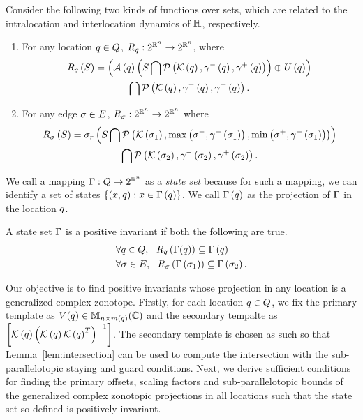 Consider the following two kinds of functions over sets, which are related to the intralocation and interlocation dynamics of $\mathbb{H}$, respectively.
\begin{enumerate}
\item For any location $q\in Q$, $R_{q}:2^{\mathbb{R}^n}\rightarrow 2^{\mathbb{R}^n}$, where 
\begin{multline*}
R_{q}\left(S\right) = \left(\mathcal{A}\left(q\right)\left(S\bigcap\mathcal{P}\left(\mathcal{K}\left(q\right),\gamma^-\left(q\right),\gamma^+\left(q\right)\right)\right)\oplus U\left(q\right)\right)\\  \bigcap \mathcal{P}\left(\mathcal{K}\left(q\right),\gamma^-\left(q\right),\gamma^+\left(q\right)\right).
\end{multline*}
\item For any edge $\sigma\in E$, $R_{\sigma}:2^{\mathbb{R}^n}\rightarrow 2^{\mathbb{R}^n}$ where
\begin{multline*}
R_{\sigma}\left(S\right) =  \sigma_r\left(S\bigcap \mathcal{P}\left(\mathcal{K}\left(\sigma_{1}\right),\max\left(\sigma^-,\gamma^-\left(\sigma_{1}\right)\right),\min\left(\sigma^+,\gamma^+\left(\sigma_{1}\right) \right)\right)\right) \\ \bigcap\mathcal{P}\left(\mathcal{K}\left(\sigma_{2}\right),\gamma^-\left(\sigma_{2}\right),\gamma^+\left(\sigma_{2}\right)\right).
\end{multline*}
\end{enumerate}

We call a mapping $\Gamma:Q\rightarrow 2^{\mathbb{R}^n}$ as
 a \emph{state set} because for such a mapping, we can identify a set
 of states $\left\{\left(x,q\right):x\in\Gamma\left(q\right)\right\}$.  We
 call $\Gamma\left(q\right)$ as
 the projection of $\Gamma$ in the location $q$.

\begin{definition}
A state set $\Gamma$ is a positive invariant if
both the following are true.
\begin{align}
& \forall q\in Q,~~R_{q}\left(\Gamma(q)\right) \subseteq \Gamma\left(q\right)\\
& \forall\sigma\in E,~~R_{\sigma}\left(\Gamma\left(\sigma_{1}\right)\right) \subseteq
  \Gamma\left(\sigma_{2}\right).
\end{align}
\end{definition}


Our objective is to find positive invariants whose projection in any
location is a generalized complex zonotope.  Firstly, for each
location $q\in Q$, we fix the primary template as
$V(q)\in\mathbb{M}_{n\times m(q)}(\mathbb{\mathbb{C}})$ and the secondary tempalte as
$\left[\mathcal{K}\left(q\right)\left(\mathcal{K}\left(q\right)\mathcal{K}\left(q\right)^T\right)^{-1}\right]$.  The secondary template
is chosen as such so that Lemma~\ref{lem:intersection} can be used to
compute the intersection with the sub-parallelotopic staying and guard
conditions.  Next, we derive sufficient conditions for finding the
primary offsets, scaling factors and sub-parallelotopic bounds of the
generalized complex zonotopic projections in all locations such that
the state set so defined is positively invariant.

